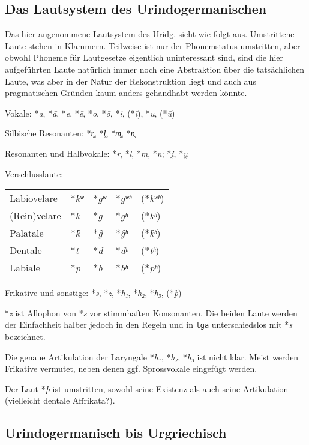 \documentclass[12pt,a4paper,normalheadings,bibliography=totoc]{scrartcl}
\def\rek#1{\mbox{*\textit{#1}}}
\def\tt#1{\texttt{#1}}
\begin{document}
\subsection{Das Lautsystem des Urindogermanischen}

Das hier angenommene Lautsystem des Uridg. sieht wie folgt aus.
Umstrittene Laute stehen in Klammern.
Teilweise ist nur der Phonemstatus umstritten,
aber obwohl Phoneme für Lautgesetze eigentlich uninteressant sind,
sind die hier aufgeführten Laute natürlich immer noch
eine Abstraktion über die tatsächlichen Laute,
was aber in der Natur der Rekonstruktion liegt
und auch aus pragmatischen Gründen kaum anders gehandhabt werden könnte.

\bigskip
\noindent
Vokale: \rek{a}, \rek{ā}, \rek{e}, \rek{ē}, \rek{o}, \rek{ō},
\rek{i}, (\rek{ī}), \rek{u}, (\rek{ū})

\noindent
Silbische Resonanten: \rek{r̥}, \rek{l̥}, \rek{m̥}, \rek{n̥}

\noindent
Resonanten und Halbvokale: \rek{r}, \rek{l}, \rek{m}, \rek{n}; \rek{i̯}, \rek{u̯}

\noindent
Verschlusslaute:\\
\begin{tabular}{l l l l l}
Labiovelare & \rek{kʷ} & \rek{gʷ} & \rek{gʷʰ} & (\rek{kʷʰ})\\
(Rein)velare & \rek{k} & \rek{g} & \rek{gʰ} & (\rek{kʰ})\\
Palatale & \rek{k̑} & \rek{g̑} & \rek{g̑ʰ} & (\rek{k̑ʰ})\\
Dentale & \rek{t} & \rek{d} & \rek{dʰ} & (\rek{tʰ})\\
Labiale & \rek{p} & \rek{b} & \rek{bʰ} & (\rek{pʰ})\\
\end{tabular}

\noindent
Frikative und sonstige: \rek{s}, \rek{z}, \rek{h₁}, \rek{h₂}, \rek{h₃}, (\rek{þ})

\bigskip
\rek{z} ist Allophon von \rek{s} vor stimmhaften Konsonanten.
Die beiden Laute werden der Einfachheit halber
jedoch in den Regeln und in \tt{lga}
unterschiedslos mit \rek{s} bezeichnet.

Die genaue Artikulation der Laryngale \rek{h₁}, \rek{h₂}, \rek{h₃}
ist nicht klar. Meist werden Frikative vermutet,
neben denen ggf. Sprossvokale eingefügt werden.

Der Laut \rek{þ} ist umstritten,
sowohl seine Existenz als auch seine Artikulation
(vielleicht dentale Affrikata?).

\subsection{Urindogermanisch bis Urgriechisch}
\end{document}
